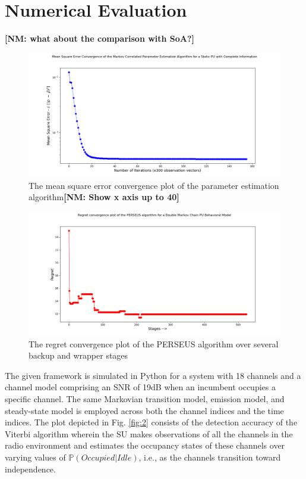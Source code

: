 \documentclass[10pt,twocolumn]{IEEEtran}
\newcommand{\nm}[1]{{\color{blue}\bf{[NM: #1]}}}
\begin{document}
\section{Numerical Evaluation}
\nm{what about the comparison with SoA?}
\begin{figure}
    \centering
    \includegraphics[scale=0.25]{Mean_Square_Plot_Log_Scale.png}
    \caption{The mean square error convergence plot of the parameter estimation algorithm\nm{Show x axis up to 40}}
    \label{fig:5}
\end{figure}
\begin{figure}
    \centering
    \includegraphics[scale=0.25]{Regret_Convergence_Plot_04112019.png}
    \caption{The regret convergence plot of the PERSEUS algorithm over several backup and wrapper stages}
    \label{fig:6}
\end{figure}
The given framework is simulated in Python for a system with 18 channels and a channel model comprising an SNR of 19dB when an incumbent occupies a specific channel. The same Markovian transition model, emission model, and steady-state model is employed across both the channel indices and the time indices. The plot depicted in Fig. \ref{fig:2} consists of the detection accuracy of the Viterbi algorithm wherein the SU makes observations of all the channels in the radio environment and estimates the occupancy states of these channels over varying values of $\mathbb{P}(Occupied|Idle)$, i.e., as the channels transition toward independence.
\end{document}
